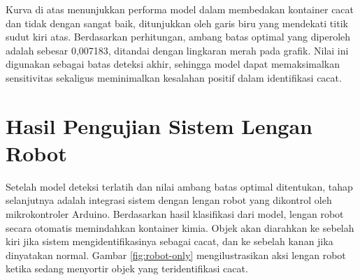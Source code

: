 Kurva di atas menunjukkan performa model dalam membedakan kontainer
cacat dan tidak dengan sangat baik, ditunjukkan oleh garis biru
yang mendekati titik sudut kiri atas. Berdasarkan perhitungan,
ambang batas optimal yang diperoleh adalah sebesar 0,007183, ditandai
dengan lingkaran merah pada grafik. Nilai ini digunakan sebagai batas
deteksi akhir, sehingga model dapat memaksimalkan sensitivitas
sekaligus meminimalkan kesalahan positif dalam identifikasi cacat.

\vspace{1em}

\section{Hasil Pengujian Sistem Lengan Robot}

Setelah model deteksi terlatih dan nilai ambang batas optimal
ditentukan, tahap selanjutnya adalah integrasi sistem dengan lengan
robot yang dikontrol oleh mikrokontroler Arduino. Berdasarkan hasil
klasifikasi dari model, lengan robot secara otomatis memindahkan
kontainer kimia. Objek akan diarahkan ke sebelah kiri jika sistem
mengidentifikasinya sebagai cacat, dan ke sebelah kanan jika
dinyatakan normal. Gambar \ref{fig:robot-only} mengilustrasikan aksi
lengan robot ketika sedang menyortir objek yang teridentifikasi cacat.

